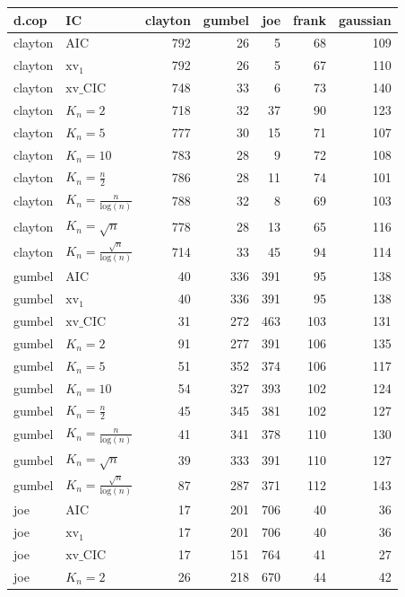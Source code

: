 \begin{table}[htbp]
\centering
\begin{tabular}{llrrrrr}
  \hline
d.cop & IC & clayton & gumbel & joe & frank & gaussian \\ 
  \hline
clayton & AIC & 792 & 26 & 5 & 68 & 109 \\ 
  clayton & $\text{xv}_{1}$ & 792 & 26 & 5 & 67 & 110 \\ 
  clayton & $\text{xv}\_\text{CIC}$ & 748 & 33 & 6 & 73 & 140 \\ 
  clayton & $K_{n}=2$ & 718 & 32 & 37 & 90 & 123 \\ 
  clayton & $K_{n}=5$ & 777 & 30 & 15 & 71 & 107 \\ 
  clayton & $K_{n}=10$ & 783 & 28 & 9 & 72 & 108 \\ 
  clayton & $K_{n}=\tfrac{n}{2}$ & 786 & 28 & 11 & 74 & 101 \\ 
  clayton & $K_{n}=\tfrac{n}{\text{log}(n)}$ & 788 & 32 & 8 & 69 & 103 \\ 
  clayton & $K_{n}=\sqrt{n}$ & 778 & 28 & 13 & 65 & 116 \\ 
  clayton & $K_{n}=\tfrac{\sqrt{n}}{\text{log}(n)}$ & 714 & 33 & 45 & 94 & 114 \\ 
   \hdashline
gumbel & AIC & 40 & 336 & 391 & 95 & 138 \\ 
  gumbel & $\text{xv}_{1}$ & 40 & 336 & 391 & 95 & 138 \\ 
  gumbel & $\text{xv}\_\text{CIC}$ & 31 & 272 & 463 & 103 & 131 \\ 
  gumbel & $K_{n}=2$ & 91 & 277 & 391 & 106 & 135 \\ 
  gumbel & $K_{n}=5$ & 51 & 352 & 374 & 106 & 117 \\ 
  gumbel & $K_{n}=10$ & 54 & 327 & 393 & 102 & 124 \\ 
  gumbel & $K_{n}=\tfrac{n}{2}$ & 45 & 345 & 381 & 102 & 127 \\ 
  gumbel & $K_{n}=\tfrac{n}{\text{log}(n)}$ & 41 & 341 & 378 & 110 & 130 \\ 
  gumbel & $K_{n}=\sqrt{n}$ & 39 & 333 & 391 & 110 & 127 \\ 
  gumbel & $K_{n}=\tfrac{\sqrt{n}}{\text{log}(n)}$ & 87 & 287 & 371 & 112 & 143 \\ 
   \hdashline
joe & AIC & 17 & 201 & 706 & 40 & 36 \\ 
  joe & $\text{xv}_{1}$ & 17 & 201 & 706 & 40 & 36 \\ 
  joe & $\text{xv}\_\text{CIC}$ & 17 & 151 & 764 & 41 & 27 \\ 
  joe & $K_{n}=2$ & 26 & 218 & 670 & 44 & 42 \\ 

\end{tabular}
\end{table}
